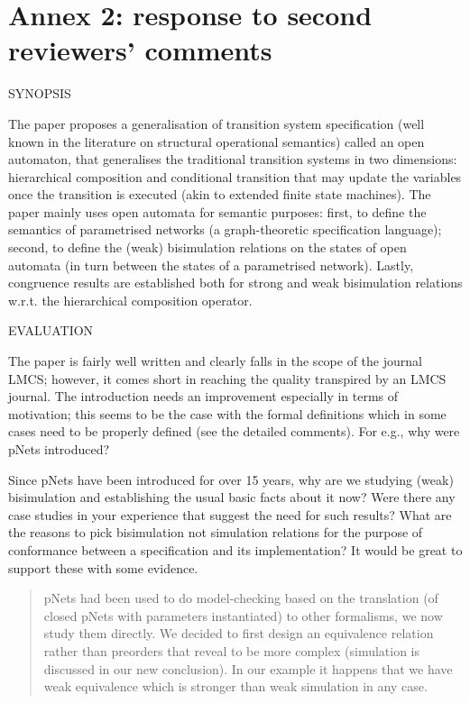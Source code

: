 \documentclass{article}
\begin{document}
\section*{Annex 2: response to second reviewers' comments}
SYNOPSIS

The paper proposes a generalisation of transition system specification (well known in the literature on structural operational semantics) called an open automaton, that generalises the traditional transition systems in two dimensions: hierarchical composition and conditional transition that may update the variables once the transition is executed (akin to extended finite state machines). The paper mainly uses open automata for semantic purposes: first, to define the semantics of parametrised networks (a graph-theoretic specification language); second, to define the (weak) bisimulation relations on the states of open automata (in turn between the states of a parametrised network). Lastly, congruence results are established both for strong and weak bisimulation relations w.r.t. the hierarchical composition operator.

EVALUATION

The paper is fairly well written and clearly falls in the scope of the journal LMCS; however, it comes short in reaching the quality transpired by an LMCS journal.
The introduction needs an improvement especially in terms of motivation; this seems to be the case with the formal definitions which in some cases need to be properly defined (see the detailed comments). For e.g., why were pNets introduced? 

Since pNets have been introduced for over 15 years, why are we studying (weak) bisimulation and establishing the usual basic facts about it now? Were there any case studies in your experience that suggest the need for such results? What are the reasons to pick bisimulation not simulation relations for the purpose of conformance between a specification and its implementation? It would be great to support these with some evidence.

\begin{quote}
pNets had been used to do model-checking based on the translation (of closed pNets with parameters instantiated) to other formalisms, we now study them directly. We decided to first design an equivalence relation rather than  preorders that reveal to be more complex (simulation is discussed in our new conclusion). In our example it happens that we have weak equivalence which is stronger than weak simulation in any case.
\end{quote}
\end{document}
